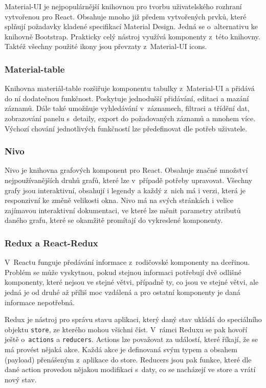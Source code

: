 Material-UI je nejpopulárnější knihovnou pro tvorbu uživatelského rozhraní vytvořenou pro React. Obsahuje mnoho již předem vytvořených prvků, které splňují požadavky kladené specifikací Material Design. Jedná se o~alternativu ke knihovně Bootstrap. Prakticky celý nástroj využívá komponenty z~této knihovny. Taktéž všechny použité ikony jsou převzaty z~Material-UI icons.

\subsubsection *{Material-table}

Knihovna materiál-table rozšiřuje komponentu tabulky z~Material-UI a přidává do ní dodatečnou funkčnost. Poskytuje jednodušší přidávání, editaci a mazání záznamů. Dále také umožňuje vyhledávání v~záznamech, filtraci a třídění dat, zobrazování panelu s~detaily, export do požadovaných záznamů a mnohem více. Výchozí chování jednotlivých funkčností lze předefinovat dle potřeb uživatele.

\subsubsection *{Nivo}

Nivo je knihovna grafových komponent pro React. Obsahuje značné množství nejpoužívanějších druhů grafů, které lze v~případě potřeby upravovat. Všechny grafy jsou interaktivní, obsahují i legendy a každý z~nich má i verzi, která je responzivní ke změně velikosti okna. Nivo má na svých stránkách i velice zajímavou interaktivní dokumentaci, ve které lze měnit parametry atributů daného grafu, které se okamžitě promítají do vykreslené komponenty. 

\subsubsection *{Redux a React-Redux}

V~Reactu funguje předávání informace z~rodičovské komponenty na dceřinou. Problém se může vyskytnou, pokud stejnou informaci potřebují dvě odlišné komponenty, které nejsou ve stejné větvi, případně ty, co jsou ve stejné větvi, ale jedná je od druhé až příliš moc vzdálená a pro ostatní komponenty je daná informace nepotřebná. 

Redux je nástroj pro správu stavu aplikaci, který daný stav ukládá do speciálního objektu \texttt{store}, ze kterého mohou všichni číst. V~rámci Reduxu se pak hovoří ještě o~\texttt{actions} a \texttt{reducers}. Actions lze považovat za událostí, které říkají, že se má provést nějaká akce. Každá akce je definovaná svým typem a obsahem (payload) přenášeným z~aplikace do store. Reducers jsou pak funkce, které dle dané action provedou nějakou modifikaci s~daty, co se nacházejí ve store a vrátí nový stav.

